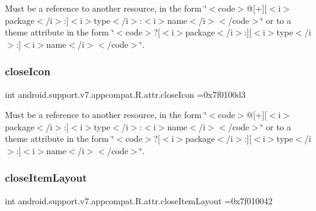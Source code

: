 Must be a reference to another resource, in the form \char`\"{}$<$code$>$@\mbox{[}+\mbox{]}\mbox{[}$<$i$>$package$<$/i$>$\+:\mbox{]}$<$i$>$type$<$/i$>$\+:$<$i$>$name$<$/i$>$$<$/code$>$\char`\"{} or to a theme attribute in the form \char`\"{}$<$code$>$?\mbox{[}$<$i$>$package$<$/i$>$\+:\mbox{]}\mbox{[}$<$i$>$type$<$/i$>$\+:\mbox{]}$<$i$>$name$<$/i$>$$<$/code$>$\char`\"{}. \mbox{\label{classandroid_1_1support_1_1v7_1_1appcompat_1_1R_1_1attr_a37078ec84b7d7129c2ee45c4a2639dc7}} 
\subsubsection{\texorpdfstring{close\+Icon}{closeIcon}}
{\footnotesize\ttfamily int android.\+support.\+v7.\+appcompat.\+R.\+attr.\+close\+Icon =0x7f0100d3\hspace{0.3cm}{\ttfamily [static]}}

Must be a reference to another resource, in the form \char`\"{}$<$code$>$@\mbox{[}+\mbox{]}\mbox{[}$<$i$>$package$<$/i$>$\+:\mbox{]}$<$i$>$type$<$/i$>$\+:$<$i$>$name$<$/i$>$$<$/code$>$\char`\"{} or to a theme attribute in the form \char`\"{}$<$code$>$?\mbox{[}$<$i$>$package$<$/i$>$\+:\mbox{]}\mbox{[}$<$i$>$type$<$/i$>$\+:\mbox{]}$<$i$>$name$<$/i$>$$<$/code$>$\char`\"{}. \mbox{\label{classandroid_1_1support_1_1v7_1_1appcompat_1_1R_1_1attr_a8372686a9d3636588a945d0cfd5ac569}} 
\subsubsection{\texorpdfstring{close\+Item\+Layout}{closeItemLayout}}
{\footnotesize\ttfamily int android.\+support.\+v7.\+appcompat.\+R.\+attr.\+close\+Item\+Layout =0x7f010042\hspace{0.3cm}{\ttfamily [static]}}

